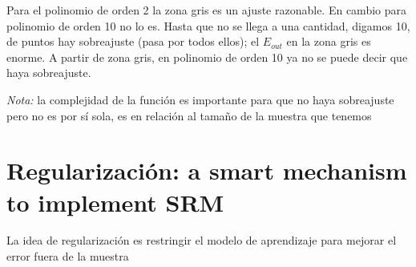\documentclass[11pt,a4paper]{article}
\theoremstyle{definition}
\begin{document}
	Para el polinomio de orden 2 la zona gris es un ajuste razonable. En cambio para polinomio de orden 10 no lo es. Hasta que no se llega a una cantidad, digamos 10, de puntos hay sobreajuste (pasa por todos ellos); el $E_{out}$ en la zona gris es enorme. A partir de zona gris, en polinomio de orden 10 ya no se puede decir que haya sobreajuste.
	
	\textit{Nota:} la complejidad de la función es importante para que no haya sobreajuste pero no es por sí sola, es en relación al tamaño de la muestra que tenemos
	\section{Regularización: a smart mechanism to implement SRM}
	La idea de regularización es restringir el modelo de aprendizaje para mejorar el error fuera de la muestra
\end{document}
